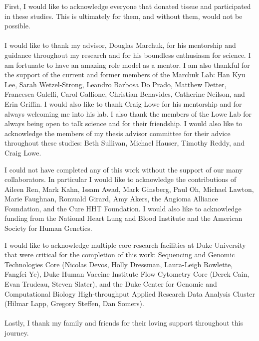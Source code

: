 \acknowledgements
First, I would like to acknowledge everyone that donated tissue and participated in these studies. This is ultimately for them, and without them, would not be possible. 
\\ \\
I would like to thank my advisor, Douglas Marchuk, for his mentorship and guidance throughout my research and for his boundless enthusiasm for science. I am fortunate to have an amazing role model as a mentor. I am also thankful for the support of the current and former members of the Marchuk Lab: Han Kyu Lee, Sarah Wetzel-Strong, Leandro Barbosa Do Prado, Matthew Detter, Francesca Galeffi, Carol Gallione, Christian Benavides, Catherine Neilson, and Erin Griffin. I would also like to thank Craig Lowe for his mentorship and for always welcoming me into his lab. I also thank the members of the Lowe Lab for always being open to talk science and for their friendship. I would also like to acknowledge the members of my thesis advisor committee for their advice throughout these studies: Beth Sullivan, Michael Hauser, Timothy Reddy, and Craig Lowe. 

I could not have completed any of this work without the support of our many collaborators. In particular I would like to acknowledge the contributions of Aileen Ren, Mark Kahn, Issam Awad, Mark Ginsberg, Paul Oh, Michael Lawton, Marie Faughnan, Romuald Girard, Amy Akers, the Angioma Alliance Foundation, and the Cure HHT Foundation. I would also like to acknowledge funding from the National Heart Lung and Blood Institute and the American Society for Human Genetics.

I would like to acknowledge multiple core research facilities at Duke University that were critical for the completion of this work: Sequencing and Genomic Technologies Core (Nicolas Devos, Holly Dressman, Laura-Leigh Rowlette, Fangfei Ye), Duke Human Vaccine Institute Flow Cytometry Core (Derek Cain, Evan Trudeau, Steven Slater), and the Duke Center for Genomic and Computational Biology High-throughput Applied Research Data Analysis Cluster (Hilmar Lapp, Gregory Steffen, Dan Somers). 
\\ \\
Lastly, I thank my family and friends for their loving support throughout this journey. 